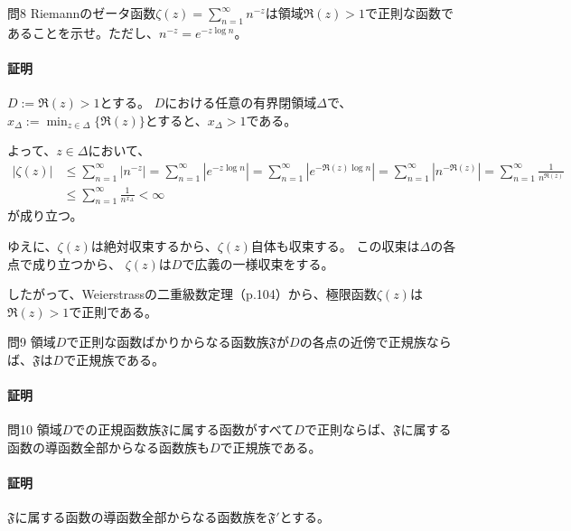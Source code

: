 \begin{mysimplebox}{問8}
    Riemannのゼータ函数$\zeta(z)=\sum_{n=1}^{\infty}n^{-z}$は領域$\Re(z)>1$で正則な函数であることを示せ。ただし、$n^{-z}=e^{-z\log n}$。
\end{mysimplebox}
\paragraph{証明}
$D:=\Re(z)>1$とする。
$D$における任意の有界閉領域$\Delta$で、$x_\Delta:=\min_{z\in\Delta}\{\Re(z)\}$とすると、$x_\Delta>1$である。

よって、$z\in\Delta$において、
\begin{align*}
    |\zeta(z)|&\le\sum_{n=1}^{\infty}|n^{-z}|
    =\sum_{n=1}^{\infty}|e^{-z\log n}|
    =\sum_{n=1}^{\infty}|e^{-\Re(z)\log n}|
    =\sum_{n=1}^{\infty}|n^{-\Re(z)}|
    =\sum_{n=1}^{\infty}\frac{1}{n^{\Re(z)}}\\
    &\le\sum_{n=1}^{\infty}\frac{1}{n^{x_\Delta}}
    <\infty
\end{align*}
が成り立つ。

ゆえに、$\zeta(z)$は絶対収束するから、$\zeta(z)$自体も収束する。
この収束は$\Delta$の各点で成り立つから、
$\zeta(z)$は$D$で広義の一様収束をする。

したがって、Weierstrassの二重級数定理（p.104）から、極限函数$\zeta(z)$は$\Re(z)>1$で正則である。

\begin{mysimplebox}{問9}
    領域$D$で正則な函数ばかりからなる函数族$\mathfrak{F}$が$D$の各点の近傍で正規族ならば、$\mathfrak{F}$は$D$で正規族である。
\end{mysimplebox}
\paragraph{証明}


\begin{mysimplebox}{問10}
    領域$D$での正規函数族$\mathfrak{F}$に属する函数がすべて$D$で正則ならば、$\mathfrak{F}$に属する函数の導函数全部からなる函数族も$D$で正規族である。
\end{mysimplebox}
\paragraph{証明}
$\mathfrak{F}$に属する函数の導函数全部からなる函数族を$\mathfrak{F'}$とする。

